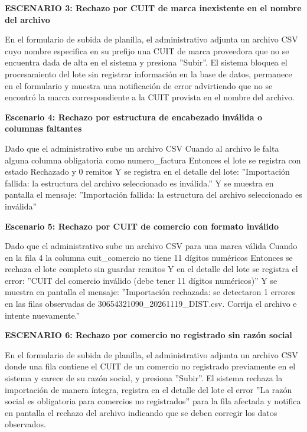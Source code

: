 \documentclass[a4paper,9pt]{article}
\begin{document}
\begin{tcolorbox}[hucard, title={\textbf{HU-2: IMPORTAR PLANILLA DE REMITOS} \hfill \scriptsize \colorbox{tealstatus}{\textbf{\ Accepted\ }} \quad \colorbox{white}{\textcolor{primarydark}{\textbf{\ 5 pts\ }}}}]
{\noindent\textbf{\textcolor{secondarydark}{ESCENARIO 3:  Rechazo por CUIT de marca inexistente en el nombre del archivo}}\par\vspace{1pt}
En el formulario de subida de planilla, el administrativo adjunta un archivo CSV cuyo nombre especifica en su prefijo una CUIT de marca proveedora que no se encuentra dada de alta en el sistema y presiona ''Subir''. El sistema bloquea el procesamiento del lote sin registrar información en la base de datos, permanece en el formulario y muestra una notificación de error advirtiendo que no se encontró la marca correspondiente a la CUIT provista en el nombre del archivo.\par\vspace{2.5pt}
\noindent\textbf{\textcolor{secondarydark}{Escenario 4:  Rechazo por estructura de encabezado inválida o columnas faltantes}}\par\vspace{1pt}
Dado que el administrativo sube un archivo CSV Cuando al archivo le falta alguna columna obligatoria como numero\_factura Entonces el lote se registra con estado Rechazado y 0 remitos Y se registra en el detalle del lote: ''Importación fallida: la estructura del archivo seleccionado es inválida.'' Y se muestra en pantalla el mensaje: ''Importación fallida: la estructura del archivo seleccionado es inválida''\par\vspace{2.5pt}
\noindent\textbf{\textcolor{secondarydark}{Escenario 5:  Rechazo por CUIT de comercio con formato inválido}}\par\vspace{1pt}
Dado que el administrativo sube un archivo CSV para una marca válida Cuando en la fila 4 la columna cuit\_comercio no tiene 11 dígitos numéricos Entonces se rechaza el lote completo sin guardar remitos Y en el detalle del lote se registra el error: ''CUIT del comercio inválido (debe tener 11 dígitos numéricos)'' Y se muestra en pantalla el mensaje: ''Importación rechazada: se detectaron 1 errores en las filas observadas de 30654321090\_20261119\_DIST.csv. Corrija el archivo e intente nuevamente.''\par\vspace{2.5pt}
\noindent\textbf{\textcolor{secondarydark}{ESCENARIO 6:  Rechazo por comercio no registrado sin razón social}}\par\vspace{1pt}
En el formulario de subida de planilla, el administrativo adjunta un archivo CSV donde una fila contiene el CUIT de un comercio no registrado previamente en el sistema y carece de su razón social, y presiona ''Subir''. El sistema rechaza la importación de manera íntegra, registra en el detalle del lote el error ''La razón social es obligatoria para comercios no registrados'' para la fila afectada y notifica en pantalla el rechazo del archivo indicando que se deben corregir los datos observados.\par\vspace{2.5pt}
}
\end{tcolorbox}
\end{document}
